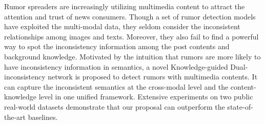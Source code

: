 Rumor spreaders are increasingly utilizing multimedia content to attract the attention and trust of news consumers. Though a set of rumor detection models have exploited the multi-modal data, they seldom consider the inconsistent relationships among images and texts. Moreover, they also fail to find a powerful way to spot the inconsistency information among the post contents and background knowledge. Motivated by the intuition that rumors are more likely to have inconsistency information in semantics, a novel Knowledge-guided Dual-inconsistency network is proposed to detect rumors with multimedia contents. It can capture the inconsistent semantics at the cross-modal level and the content-knowledge level in one unified framework. Extensive experiments on two public real-world datasets demonstrate that our proposal can outperform the state-of-the-art baselines.
